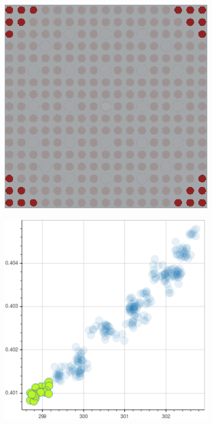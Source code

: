 \begin{figure}[h!]
\begin{subfigure}{0.45\textwidth}
  \caption{}
  \label{fig:chap10-fiss-mean-nuc-frac-mgxs}
\end{subfigure}
\begin{subfigure}{0.45\textwidth}
  \centering
  \includegraphics[width=0.9\linewidth]{figures/unsupervised/features/assm-16/u235-fiss/mean-nuc-frac/geometry-2}
  \caption{}
  \label{fig:chap10-fiss-mean-nuc-frac-geom-2}
\end{subfigure}%
\begin{subfigure}{0.45\textwidth}
  \centering
  \includegraphics[width=0.9\linewidth]{figures/unsupervised/features/assm-16/u235-fiss/mean-nuc-frac/mgxs-2}

\end{subfigure}
\end{figure}
